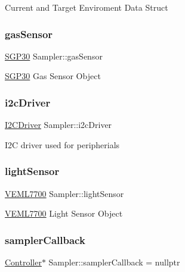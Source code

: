 Current and Target Enviroment Data Struct \mbox{\label{classSampler_a4af78e46617fc8cdbc4bd14a7db5c741}} 
\subsubsection{\texorpdfstring{gas\+Sensor}{gasSensor}}
{\footnotesize\ttfamily \hyperlink{classSGP30}{S\+G\+P30} Sampler\+::gas\+Sensor\hspace{0.3cm}{\ttfamily [private]}}

\hyperlink{classSGP30}{S\+G\+P30} Gas Sensor Object \mbox{\label{classSampler_ada5598060be79a005bf4375fcbf9773d}} 
\subsubsection{\texorpdfstring{i2c\+Driver}{i2cDriver}}
{\footnotesize\ttfamily \hyperlink{classI2CDriver}{I2\+C\+Driver} Sampler\+::i2c\+Driver\hspace{0.3cm}{\ttfamily [private]}}

I2C driver used for peripherials \mbox{\label{classSampler_ae81394f464670af514f8dc7c5df46d74}} 
\subsubsection{\texorpdfstring{light\+Sensor}{lightSensor}}
{\footnotesize\ttfamily \hyperlink{classVEML7700}{V\+E\+M\+L7700} Sampler\+::light\+Sensor\hspace{0.3cm}{\ttfamily [private]}}

\hyperlink{classVEML7700}{V\+E\+M\+L7700} Light Sensor Object \mbox{\label{classSampler_a3a37b5d667134d905e4bda45974cb936}} 
\subsubsection{\texorpdfstring{sampler\+Callback}{samplerCallback}}
{\footnotesize\ttfamily \hyperlink{classController}{Controller}$\ast$ Sampler\+::sampler\+Callback = nullptr\hspace{0.3cm}{\ttfamily [private]}}

